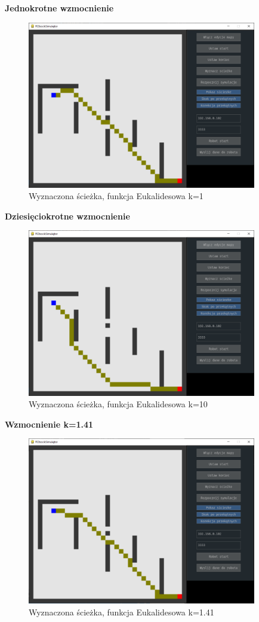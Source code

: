 \textbf{Jednokrotne wzmocnienie}
\begin{figure}[H]
	\centering
	\includegraphics[width=10cm]{pages/testy/zdjecia/test3_ekualides_k1.png}
	\caption{Wyznaczona ścieżka, funkcja Eukalidesowa k=1}
\end{figure}
\textbf{Dziesięciokrotne wzmocnienie}

\begin{figure}[H]
	\centering
	\includegraphics[width=10cm]{pages/testy/zdjecia/test3_ekualides_k10.png}
	\caption{Wyznaczona ścieżka, funkcja Eukalidesowa k=10}
\end{figure}
\textbf{Wzmocnienie k=1.41}

\begin{figure}[H]
	\centering
	\includegraphics[width=10cm]{pages/testy/zdjecia/test3_ekualides_k141.png}
	\caption{Wyznaczona ścieżka, funkcja Eukalidesowa k=1.41}
\end{figure}

